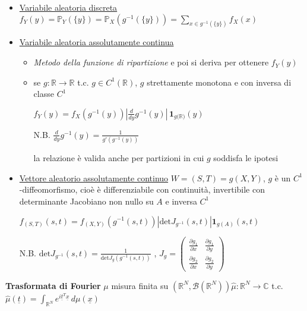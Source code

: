 \documentclass[openany]{book} %
\begin{document}
\begin{itemize}

	\item \underline{Variabile aleatoria discreta} $f_Y(y)=\mathbb{P}_Y(\{y\})=\mathbb{P}_X(g^{-1}(\{y\}))=\sum_{x\in g^{-1}(\{y\})}f_X(x)$

	\item \underline{Variabile aleatoria assolutamente continua}

	      \begin{itemize}

		      \item \textit{Metodo della funzione di ripartizione} e poi si deriva per ottenere $f_Y(y)$

		      \item se $g:\mathbb{R}\rightarrow \mathbb{R}$ t.c. $g\in C^1(\mathbb{R})$, $g$ strettamente monotona e con inversa di classe $C^1$

		            $f_Y(y)=f_X(g^{-1}(y))|\frac{d}{dy}g^{-1}(y)|\,\boldsymbol{1}_{g(\mathbb{R)}}(y)$

		            N.B. $\frac{d}{dy}g^{-1}(y) = \frac{1}{g'(g^{-1}(y))}$

		            la relazione è valida anche per partizioni in cui $g$ soddisfa le ipotesi

	      \end{itemize}

	\item \underline{Vettore aleatorio assolutamente continuo} $W = (S,T) = g(X,Y)$, $g$ è un $C^1$-diffeomorfismo, cioè è differenziabile con continuità, invertibile con determinante Jacobiano non nullo su $A$ e inversa $C^1$

	      $f_{(S,T)}(s,t)=f_{(X,Y)}(g^{-1}(s,t))\left|\text{det} J_{g^{-1}}(s,t)\right|\boldsymbol{1}_{g(A)}(s,t)$

	      N.B. $\text{det}J_{g^{-1}}(s,t)=\frac{1}{\text{det}J_g(g^{-1}(s,t))}$ , $J_g=\left(\begin{array}{cc}\frac{\partial g_1}{\partial x} & \frac{\partial g_1}{\partial y} \\ \frac{\partial g_2}{\partial x} & \frac{\partial g_2}{\partial y} \end{array}\right)$

\end{itemize}

\textbf{Trasformata di Fourier} $\mu$ misura finita su $(\mathbb{R}^N, \mathcal{B}(\mathbb{R}^N))$\quad $\hat {\mu}:\mathbb{R}^N\rightarrow \mathbb{C}$ t.c. $\hat {\mu}(\underline{t})=\int_{\mathbb{R}^N}e^{i \underline{t}^T \underline{x}}\,d\mu(\underline{x})$
\end{document}
